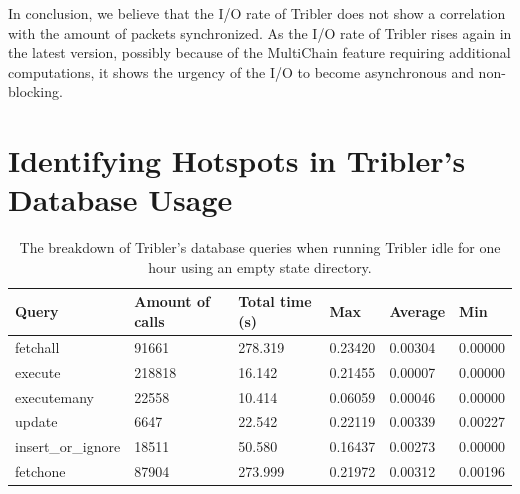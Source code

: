In conclusion, we believe that the I/O rate of Tribler does not show a correlation with the amount of packets synchronized. As the I/O rate of Tribler rises again in the latest version, possibly because of the MultiChain feature requiring additional computations, it shows the urgency of the I/O to become asynchronous and non-blocking.

\section{Identifying Hotspots in Tribler's Database Usage}
\label{sct:db_performance_analysis}

\begin{table}[h]
	\centering
	\caption{The breakdown of Tribler's database queries when running Tribler idle for one hour using an empty state directory.}
	\label{table:query_breakdown_tribler_empty_state_dir}
	\begin{tabular}{|l|l|l|l|l|l|}
		\hline
		\textbf{Query}     & \textbf{Amount of calls} & \textbf{Total time (s)} & \textbf{Max} & \textbf{Average} & \textbf{Min} \\ \hline
		fetchall           & 91661                    & 278.319                 & 0.23420      & 0.00304          & 0.00000      \\ \hline
		execute            & 218818                   & 16.142                  & 0.21455      & 0.00007          & 0.00000      \\ \hline
		executemany        & 22558                    & 10.414                  & 0.06059      & 0.00046          & 0.00000      \\ \hline
		update             & 6647                     & 22.542                  & 0.22119      & 0.00339          & 0.00227      \\ \hline
		insert\_or\_ignore & 18511                    & 50.580                  & 0.16437      & 0.00273          & 0.00000      \\ \hline
		fetchone           & 87904                    & 273.999                 & 0.21972      & 0.00312          & 0.00196      \\ \hline
	\end{tabular}
\end{table}

